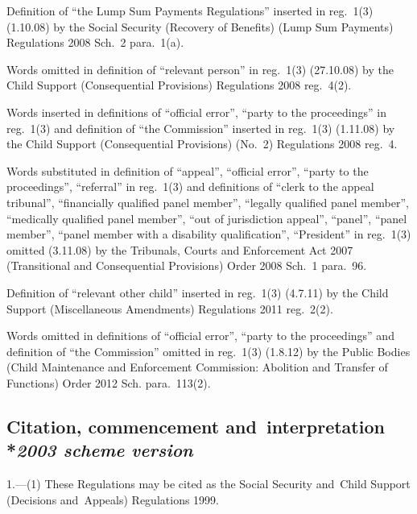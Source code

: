 \documentclass[12pt,a4paper]{article}
\begin{document}
{Definition of ``the Lump Sum Payments Regulations'' inserted in reg.~1(3) (1.10.08) by the Social Security (Recovery of Benefits) (Lump Sum Payments) Regulations 2008 Sch.~2 para.~1(a).

Words omitted in definition of ``relevant person'' in reg.~1(3) (27.10.08) by the Child Support (Consequential Provisions) Regulations 2008 reg.~4(2).

Words inserted in definitions of ``official error'', ``party to the proceedings'' in reg.~1(3) and definition of ``the Commission'' inserted in reg.~1(3) (1.11.08) by the Child Support (Consequential Provisions) (No.~2) Regulations 2008 reg.~4.

Words substituted in definition of ``appeal'', ``official error'', ``party to the proceedings'', ``referral'' in reg.~1(3) and definitions of ``clerk to the appeal tribunal'', ``financially qualified panel member'', ``legally qualified panel member'', ``medically qualified panel member'', ``out of jurisdiction appeal'', ``panel'', ``panel member'', ``panel member with a disability qualification'', ``President'' in reg.~1(3) omitted (3.11.08) by the Tribunals, Courts and Enforcement Act 2007 (Transitional and Consequential Provisions) Order 2008 Sch.~1 para.~96.

Definition of ``relevant other child'' inserted in reg.~1(3) (4.7.11) by the Child Support (Miscellaneous Amendments) Regulations 2011 reg.~2(2).

Words omitted in definitions of ``official error'', ``party to the proceedings'' and definition of ``the Commission'' omitted in reg.~1(3) (1.8.12) by the Public Bodies (Child Maintenance and Enforcement Commission: Abolition and Transfer of Functions) Order 2012 Sch. para.~113(2).
}

\subsection[1. Citation, commencement and~interpretation --- \emph{2003 scheme version}]{Citation, commencement and~interpretation\\*\emph{2003 scheme version}}

1.—(1) These Regulations may be cited as the Social Security and~Child Support (Decisions and~Appeals) Regulations 1999.
\end{document}
